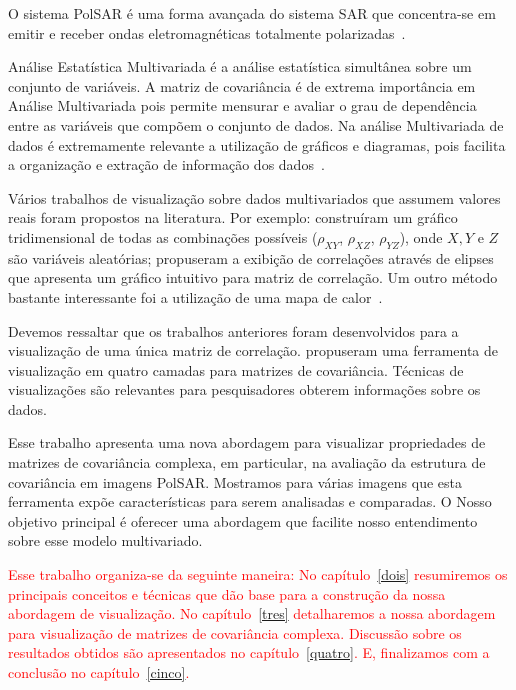 \documentclass[journal]{IEEEtran}
\begin{document}
O sistema PolSAR é uma forma avançada do sistema SAR que concentra-se em emitir e receber ondas eletromagnéticas totalmente polarizadas~\cite{ma-2015}. 

Análise Estatística Multivariada é a análise estatística simultânea sobre um conjunto de variáveis. A matriz de covariância é de extrema importância em Análise Multivariada pois permite mensurar e avaliar o grau de dependência entre as variáveis que compõem o conjunto de dados. Na análise Multivariada de dados é extremamente relevante a utilização de gráficos e diagramas, pois facilita a organização e extração de informação dos dados~\cite{anderson-1958, Everitt-2011}.

Vários trabalhos de visualização sobre dados multivariados que assumem valores reais foram propostos na literatura. Por exemplo: \cite{Rousseeuw-1994} construíram um gráfico tridimensional de todas as combinações possíveis ($\rho_{XY}$, $\rho_{XZ}$, $\rho_{YZ}$), onde $X, Y$ e $Z$ são variáveis aleatórias; \cite{Murdoch-1996} propuseram a exibição de correlações através de elipses que apresenta um gráfico intuitivo para matriz de correlação. Um outro método bastante interessante foi a utilização de uma mapa de calor~\cite{Friendly-2002}.

Devemos ressaltar que os trabalhos anteriores foram desenvolvidos para a visualização de uma única matriz de correlação. \cite{tokuda-2011} propuseram uma ferramenta de visualização em quatro camadas para matrizes de covariância. Técnicas de visualizações são relevantes para pesquisadores obterem informações sobre os dados.

Esse trabalho apresenta uma nova abordagem para visualizar propriedades de matrizes de covariância complexa, em particular, na avaliação da estrutura de covariância em imagens PolSAR. Mostramos para várias imagens que esta ferramenta expõe características para serem analisadas e comparadas. O Nosso objetivo principal é oferecer uma abordagem que facilite nosso entendimento sobre esse modelo multivariado.

\textcolor{red}{Esse trabalho organiza-se da seguinte maneira: No capítulo~\ref{dois} resumiremos os principais conceitos e técnicas que dão base para a construção da nossa abordagem de visualização. No capítulo~\ref{tres} detalharemos a nossa abordagem para visualização de matrizes de covariância complexa. Discussão sobre os resultados obtidos são apresentados no capítulo~\ref{quatro}. E, finalizamos com a conclusão no capítulo~\ref{cinco}.}

\end{document}
